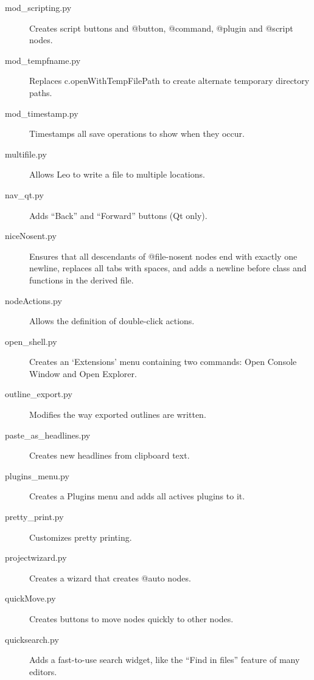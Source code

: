 \documentclass[a4paper,10pt,english]{sphinxmanual}
\begin{document}
\begin{description}
\item[{mod\_scripting.py}] \leavevmode
Creates script buttons and @button, @command, @plugin and @script
nodes.

\item[{mod\_tempfname.py}] \leavevmode
Replaces c.openWithTempFilePath to create alternate temporary
directory paths.

\item[{mod\_timestamp.py}] \leavevmode
Timestamps all save operations to show when they occur.

\item[{multifile.py}] \leavevmode
Allows Leo to write a file to multiple locations.

\item[{nav\_qt.py}] \leavevmode
Adds ``Back'' and ``Forward'' buttons (Qt only).

\item[{niceNosent.py}] \leavevmode
Ensures that all descendants of @file-nosent nodes end
with exactly one newline, replaces all tabs with spaces, and
adds a newline before class and functions in the derived file.

\item[{nodeActions.py}] \leavevmode
Allows the definition of double-click actions.

\item[{open\_shell.py}] \leavevmode
Creates an `Extensions' menu containing two commands:
Open Console Window and Open Explorer.

\item[{outline\_export.py}] \leavevmode
Modifies the way exported outlines are written.

\item[{paste\_as\_headlines.py}] \leavevmode
Creates new headlines from clipboard text.

\item[{plugins\_menu.py}] \leavevmode
Creates a Plugins menu and adds all actives plugins to it.

\item[{pretty\_print.py}] \leavevmode
Customizes pretty printing.

\item[{projectwizard.py}] \leavevmode
Creates a wizard that creates @auto nodes.

\item[{quickMove.py}] \leavevmode
Creates buttons to move nodes quickly to other nodes.

\item[{quicksearch.py}] \leavevmode
Adds a fast-to-use search widget, like the ``Find in files'' feature of many editors.


\end{description}
\end{document}
